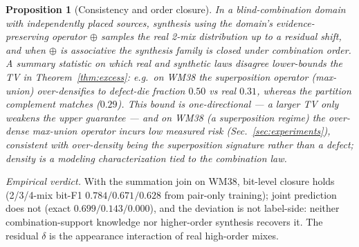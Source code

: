 \documentclass[11pt]{article}
\newtheorem{proposition}{Proposition}
\begin{document}
\begin{proposition}[Consistency and order closure]
In a blind-combination domain with independently placed sources, synthesis using
the domain's evidence-preserving operator $\oplus$ samples the real 2-mix
distribution up to a residual shift, and when $\oplus$ is associative the synthesis
family is closed under combination order. A summary statistic on which real and
synthetic laws disagree lower-bounds the TV in Theorem~\ref{thm:excess}: e.g.\ on WM38
the superposition operator (max-union) over-densifies to defect-die fraction $0.50$ vs
real $0.31$, whereas the partition complement matches ($0.29$). This bound is
one-directional --- a larger TV only weakens the \emph{upper} guarantee --- and on WM38
(a superposition regime) the over-dense max-union operator incurs low measured risk
(Sec.~\ref{sec:experiments}), consistent with over-density being the superposition
signature rather than a defect; density is a modeling characterization tied to the
combination law.
\end{proposition}

\emph{Empirical verdict.} With the summation join on WM38, bit-level
closure holds (2/3/4-mix bit-F1 $0.784/0.671/0.628$ from pair-only training); joint
prediction does not (exact $0.699/0.143/0.000$), and the deviation is not
label-side: neither combination-support knowledge nor higher-order synthesis
recovers it. The residual $\delta$ is the appearance interaction of real high-order
mixes.
\end{document}
